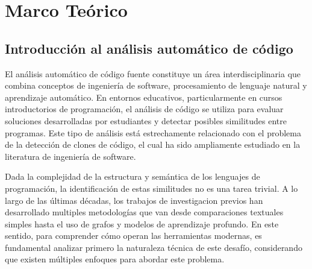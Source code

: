 \chapter{Marco Teórico}

\section{Introducción al análisis automático de código}

El análisis automático de código fuente constituye un área interdisciplinaria que combina conceptos de ingeniería de software, procesamiento de lenguaje natural y aprendizaje automático. En entornos educativos, particularmente en cursos introductorios de programación, el análisis de código se utiliza para evaluar soluciones desarrolladas por estudiantes y detectar posibles similitudes entre programas. Este tipo de análisis está estrechamente relacionado con el problema de la detección de clones de código, el cual ha sido ampliamente estudiado en la literatura de ingeniería de software.

Dada la complejidad de la estructura y semántica de los lenguajes de programación, la identificación de estas similitudes no es una tarea trivial. A lo largo de las últimas décadas, los trabajos de investigacion previos han desarrollado multiples metodologías que van desde comparaciones textuales simples hasta el uso de grafos y modelos de aprendizaje profundo. En este sentido, para comprender cómo operan las herramientas modernas, es fundamental analizar primero la naturaleza técnica de este desafío, considerando que existen múltiples enfoques para abordar este problema. 





